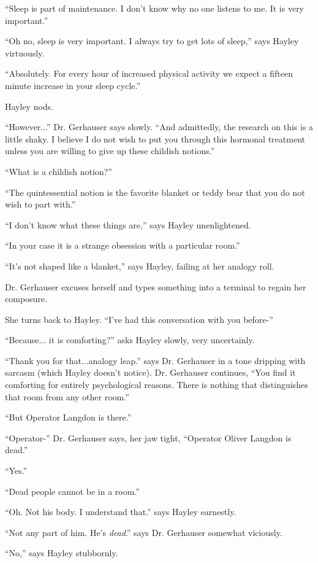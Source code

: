 ``Sleep is part of maintenance.  I don't know why no one listens to me.  It is very important.''

``Oh no, sleep is very important.  I always try to get lots of sleep,'' says Hayley virtuously.

``Absolutely. For every hour of increased physical activity we expect a fifteen minute increase in your sleep cycle.''

Hayley nods.

``However...'' Dr. Gerhauser says slowly. ``And admittedly, the research on this is a little shaky.  I believe I do not wish to put you through this hormonal treatment unless you are willing to give up these childish notions.''

``What is a childish notion?''

``The quintessential notion is the favorite blanket or teddy bear that you do not wish to part with.''

``I don't know what these things are,'' says Hayley unenlightened.

``In your case it is a strange obsession with a particular room.''

``It's not shaped like a blanket,'' says Hayley, failing at her analogy roll.

Dr. Gerhauser excuses herself and types something into a terminal to regain her composure.

She turns back to Hayley.  ``I've had this conversation with you before-''

``Because... it is comforting?'' asks Hayley slowly, very uncertainly.

``Thank you for that...analogy leap.'' says Dr. Gerhauser in a tone dripping with sarcasm (which Hayley doesn't notice).  Dr. Gerhauser continues, ``You find it comforting for entirely psychological reasons.  There is nothing that distinguishes that room from any other room.''

``But Operator Langdon is there.''

``Operator-'' Dr. Gerhauser says, her jaw tight,  ``Operator Oliver Langdon is dead.''

``Yes.''

``Dead people cannot be in a room.''

``Oh.  Not his body.  I understand that.'' says Hayley earnestly.

``Not any part of him.  He's \textit{dead}.'' says Dr. Gerhauser somewhat viciously.

``No,'' says Hayley stubbornly.

